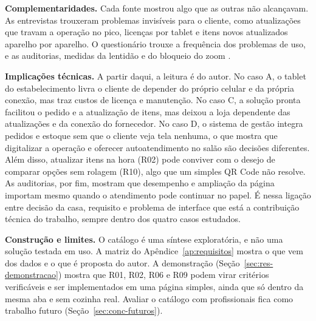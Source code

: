 \textbf{Complementaridades.} Cada fonte mostrou algo que as outras não alcançavam. As entrevistas trouxeram problemas invisíveis para o cliente, como atualizações que travam a operação no pico, licenças por tablet e itens novos atualizados aparelho por aparelho. O questionário trouxe a frequência dos problemas de uso, e as auditorias, medidas da lentidão e do bloqueio do zoom \cite{wcag22}.

\textbf{Implicações técnicas.} A partir daqui, a leitura é do autor. No caso A, o tablet do estabelecimento livra o cliente de depender do próprio celular e da própria conexão, mas traz custos de licença e manutenção. No caso C, a solução pronta facilitou o pedido e a atualização de itens, mas deixou a loja dependente das atualizações e da conexão do fornecedor. No caso D, o sistema de gestão integra pedidos e estoque sem que o cliente veja tela nenhuma, o que mostra que digitalizar a operação e oferecer autoatendimento no salão são decisões diferentes. Além disso, atualizar itens na hora (R02) pode conviver com o desejo de comparar opções sem rolagem (R10), algo que um simples QR Code não resolve. As auditorias, por fim, mostram que desempenho e ampliação da página importam mesmo quando o atendimento pode continuar no papel. É nessa ligação entre decisão da casa, requisito e problema de interface que está a contribuição técnica do trabalho, sempre dentro dos quatro casos estudados.

\textbf{Construção e limites.} O catálogo é uma síntese exploratória, e não uma solução testada em uso. A matriz do Apêndice~\ref{ap:requisitos} mostra o que vem dos dados e o que é proposta do autor. A demonstração (Seção~\ref{sec:res-demonstracao}) mostra que R01, R02, R06 e R09 podem virar critérios verificáveis e ser implementados em uma página simples, ainda que só dentro da mesma aba e sem cozinha real. Avaliar o catálogo com profissionais fica como trabalho futuro (Seção~\ref{sec:conc-futuros}).